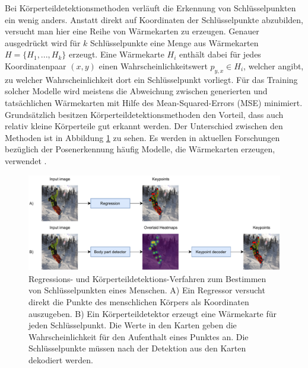 Bei Körperteildetektionsmethoden verläuft die Erkennung von Schlüsselpunkten ein
wenig anders. Anstatt direkt auf Koordinaten der Schlüsselpunkte abzubilden,
versucht man hier eine Reihe von Wärmekarten zu erzeugen. Genauer ausgedrückt
wird für $k$ Schlüsselpunkte eine Menge aus Wärmekarten $H = \{H_1, ..., H_k\}$
erzeugt. Eine Wärmekarte $H_i$ enthält dabei für jedes Koordinatenpaar $(x, y)$
einen Wahrscheinlichkeitswert $p_{y, x} \in H_i$, welcher angibt, zu welcher
Wahrscheinlichkeit dort ein Schlüsselpunkt vorliegt.  Für das Training solcher
Modelle wird meistens die Abweichung zwischen generierten und tatsächlichen
Wärmekarten mit Hilfe des Mean-Squared-Errors (MSE) minimiert. Grund\-sätz\-lich
besitzen Körperteildetektionsmethoden den Vorteil, dass auch relativ kleine
Körperteile gut erkannt werden. Der Unterschied zwischen den Methoden ist in
Abbildung \ref{fig:pose-detection} zu sehen. Es werden in aktuellen Forschungen
bezüglich der Posenerkennung häufig Modelle, die Wärmekarten erzeugen, verwendet
\cite{zheng2021deep}.

\begin{figure}
    \includegraphics[width=\textwidth]{images/pose_detection.pdf}
    \caption{Regressions- und Körperteildetektions-Verfahren
    zum Bestimmen von Schlüsselpunkten eines Menschen. A) Ein Regressor
    versucht direkt die Punkte des menschlichen Körpers als Koordinaten
    auszugeben. B) Ein Körperteildetektor erzeugt eine Wärmekarte für jeden
    Schlüsselpunkt. Die Werte in den Karten geben die Wahrscheinlichkeit für den
    Aufenthalt eines Punktes an. Die Schlüsselpunkte müssen nach der Detektion aus den Karten dekodiert werden.}
    \label{fig:pose-detection}
\end{figure}

